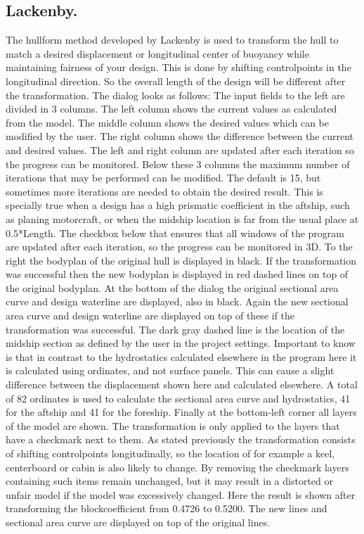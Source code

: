 \documentclass[12pt]{article}
\begin{document}
\subsection{Lackenby.}
The hullform method developed by Lackenby is used to transform the hull to match a desired
displacement or longitudinal center of buoyancy while maintaining fairness of your design. This is
done by shifting controlpoints in the longitudinal direction. So the overall length of the design will be
different after the transformation. The dialog looks as follows:
The input fields to the left are divided in 3 columns. The left column shows the current values as
calculated from the model. The middle column shows the desired values which can be modified by
the user. The right column shows the difference between the current and desired values. The left
and right column are updated after each iteration so the progress can be monitored.
Below these 3 columns the maximum number of iterations that may be performed can be modified.
The default is 15, but sometimes more iterations are needed to obtain the desired result. This is
specially true when a design has a high prismatic coefficient in the aftship, such as planing
motorcraft, or when the midship location is far from the usual place at 0.5*Length.
The checkbox below that ensures that all windows of the program are updated after each iteration,
so the progress can be monitored in 3D.
To the right the bodyplan of the original hull is displayed in black. If the transformation was
successful then the new bodyplan is displayed in red dashed lines on top of the original bodyplan.
At the bottom of the dialog the original sectional area curve and design waterline are displayed, also
in black. Again the new sectional area curve and design waterline are displayed on top of these if
the transformation was successful. The dark gray dashed line is the location of the midship section
as defined by the user in the project settings. Important to know is that in contrast to the
hydrostatics calculated elsewhere in the program here it is calculated using ordinates, and not
surface panels. This can cause a slight difference between the displacement shown here and
calculated elsewhere. A total of 82 ordinates is used to calculate the sectional area curve and
hydrostatics, 41 for the aftship and 41 for the foreship.
Finally at the bottom-left corner all layers of the model are shown. The transformation is only applied
to the layers that have a checkmark next to them. As stated previously the transformation consists
of shifting controlpoints longitudinally, so the location of for example a keel, centerboard or cabin is
also likely to change. By removing the checkmark layers containing such items remain unchanged,
but it may result in a distorted or unfair model if the model was excessively changed.
Here the result is shown after transforming the blockcoefficient from 0.4726 to 0.5200. The new
lines and sectional area curve are displayed on top of the original lines.
\end{document}
